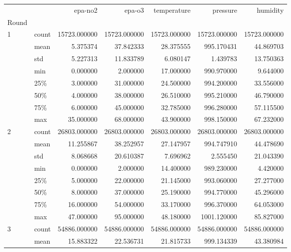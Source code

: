 \begin{tabular}{llrrrrr}
\toprule
  &       &       epa-no2 &        epa-o3 &   temperature &      pressure &      humidity \\
Round & {} &               &               &               &               &               \\
\midrule
1 & count &  15723.000000 &  15723.000000 &  15723.000000 &  15723.000000 &  15723.000000 \\
  & mean &      5.375374 &     37.842333 &     28.375555 &    995.170431 &     44.869703 \\
  & std &      5.227313 &     11.833789 &      6.080147 &      1.439783 &     13.750363 \\
  & min &      0.000000 &      2.000000 &     17.000000 &    990.970000 &      9.644000 \\
  & 25\% &      3.000000 &     31.000000 &     24.500000 &    994.200000 &     33.556000 \\
  & 50\% &      4.000000 &     38.000000 &     26.510000 &    995.210000 &     46.790000 \\
  & 75\% &      6.000000 &     45.000000 &     32.785000 &    996.280000 &     57.115500 \\
  & max &     35.000000 &     68.000000 &     43.900000 &    998.150000 &     67.232000 \\
2 & count &  26803.000000 &  26803.000000 &  26803.000000 &  26803.000000 &  26803.000000 \\
  & mean &     11.255867 &     38.252957 &     27.147957 &    994.747910 &     44.478690 \\
  & std &      8.068668 &     20.610387 &      7.696962 &      2.555450 &     21.043390 \\
  & min &      0.000000 &      2.000000 &     14.400000 &    989.230000 &      4.420000 \\
  & 25\% &      5.000000 &     22.000000 &     21.145000 &    993.060000 &     27.277000 \\
  & 50\% &      8.000000 &     37.000000 &     25.190000 &    994.770000 &     45.296000 \\
  & 75\% &     16.000000 &     54.000000 &     33.170000 &    996.370000 &     64.053000 \\
  & max &     47.000000 &     95.000000 &     48.180000 &   1001.120000 &     85.827000 \\
3 & count &  54886.000000 &  54886.000000 &  54886.000000 &  54886.000000 &  54886.000000 \\
  & mean &     15.883322 &     22.536731 &     21.815733 &    999.134339 &     43.380984 \\

\end{tabular}
